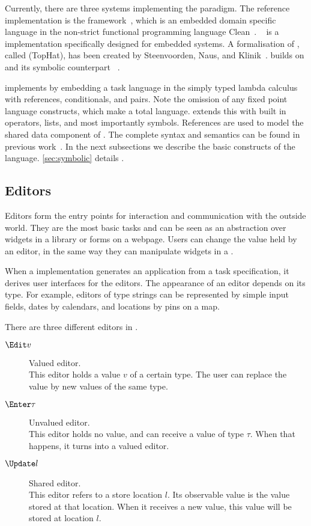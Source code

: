 Currently, there are three systems implementing the \TOP paradigm.
The reference implementation is the \ITASKS framework~\cite{DBLP:conf/ppdp/PlasmeijerLMAK12},
which is an embedded domain specific language in the non-strict functional programming language Clean~\cite{plasmeijer2002clean}.
\MTASKS~\cite{DBLP:conf/cgo/KoopmanLP18} is a \TOP implementation specifically designed for embedded systems.
A formalisation of \TOP, called \TOPHAT (TopHat), has been created by Steenvoorden, Naus, and Klinik~\cite{DBLP:conf/ppdp/SteenvoordenNK19}.
\ASTOPHAT builds on \TOPHAT and its symbolic counterpart \STOPHAT~\cite{Naus2019}.

\TOPHAT implements \TOP by embedding a task language in the simply typed lambda calculus with references, conditionals, and pairs.
Note the omission of any fixed point language constructs, which make \TOPHAT a total language.
\STOPHAT extends this with built in operators, lists, and most importantly symbols.
References are used to model the shared data component of \TOP.
The complete syntax and semantics can be found in previous work~\cite{DBLP:conf/ppdp/SteenvoordenNK19}.
In the next subsections we describe the basic constructs of the \TOPHAT language.
\cref{sec:symbolic} details \STOPHAT.


\subsection{Editors}
\label{sub:editors}

Editors form the entry points for interaction and communication with the outside world.
They are the most basic tasks and can be seen as an abstraction over widgets in a \GUI library or forms on a webpage.
Users can change the value held by an editor, in the same way they can manipulate widgets in a \GUI.

When a \TOP implementation generates an application from a task specification, it derives user interfaces for the editors.
The appearance of an editor depends on its type.
For example, editors of type strings can be represented by simple input fields, dates by calendars, and locations by pins on a map.

There are three different editors in \TOPHAT.
\begin{description}
  \item[$\Edit v$] Valued editor.\\
    This editor holds a value $v$ of a certain type.
    The user can replace the value by new values of the same type.
  \item[$\Enter \tau$] Unvalued editor.\\
    This editor holds no value, and can receive a value of type $\tau$.
    When that happens, it turns into a valued editor.
  \item[$\Update l$] Shared editor.\\
    This editor refers to a store location $l$.
    Its observable value is the value stored at that location.
    When it receives a new value, this value will be stored at location $l$.
\end{description}


